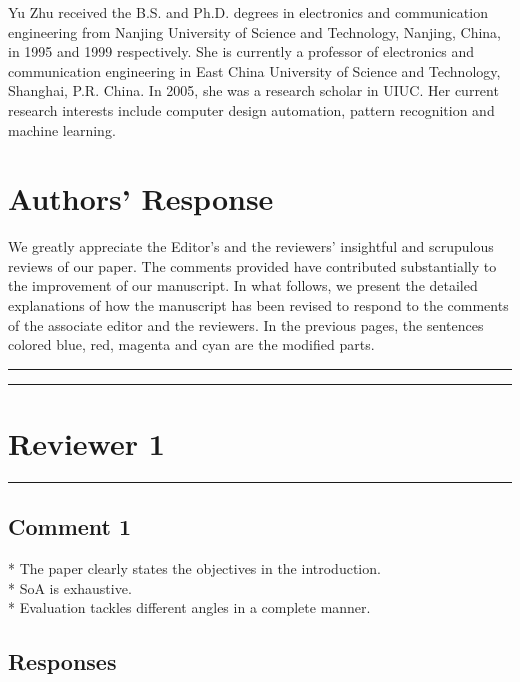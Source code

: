\documentclass[10pt,journal, compsoc]{IEEEtran}
\begin{document}

\begin{IEEEbiography}{Yu Zhu}
received the B.S. and Ph.D. degrees in electronics and communication engineering from Nanjing University of Science and Technology, Nanjing, China, in 1995 and 1999 respectively. She is currently a professor of electronics and communication engineering in East China University of Science and Technology, Shanghai, P.R. China. In 2005, she was a research scholar in UIUC. Her current research interests include computer design automation, pattern recognition and machine learning.
\end{IEEEbiography}

\clearpage

\section*{{\Large Authors' Response}}
We greatly appreciate the Editor's and the reviewers' insightful and scrupulous reviews of our paper. The comments provided have contributed substantially to the improvement of our manuscript. In what follows, we present the detailed explanations of how the manuscript has been revised to respond to the comments of the associate editor and the reviewers. In the previous pages, the sentences colored blue, red, magenta and cyan are the modified parts.


\noindent\rule[0.25\baselineskip]{252pt}{1pt}
\noindent\rule[0.25\baselineskip]{252pt}{1pt}


\vspace*{2em}


\section*{{\Large Reviewer 1}}

\noindent\rule[0.25\baselineskip]{252pt}{1pt}

\subsection*{Comment 1}
* The paper clearly states the objectives in the introduction.\\
* SoA is exhaustive.\\
* Evaluation tackles different angles in a complete manner.

\subsection*{Responses}
\end{document}
